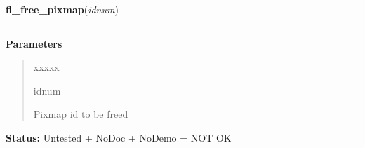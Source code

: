     \label{xformslib:library:fl_free_pixmap}

    \vspace{0.5ex}

\hspace{.8\funcindent}\begin{boxedminipage}{\funcwidth}

    \raggedright \textbf{fl\_free\_pixmap}(\textit{idnum})

    \vspace{-1.5ex}

    \rule{\textwidth}{0.5\fboxrule}
\setlength{\parskip}{2ex}
\setlength{\parskip}{1ex}
      \textbf{Parameters}
      \vspace{-1ex}

      \begin{quote}
        \begin{Ventry}{xxxxx}

          \item[idnum]

          Pixmap id to be freed

        \end{Ventry}

      \end{quote}

\textbf{Status:} Untested + NoDoc + NoDemo = NOT OK



    \end{boxedminipage}

    \label{xformslib:library:fl_add_box}

    \vspace{0.5ex}

